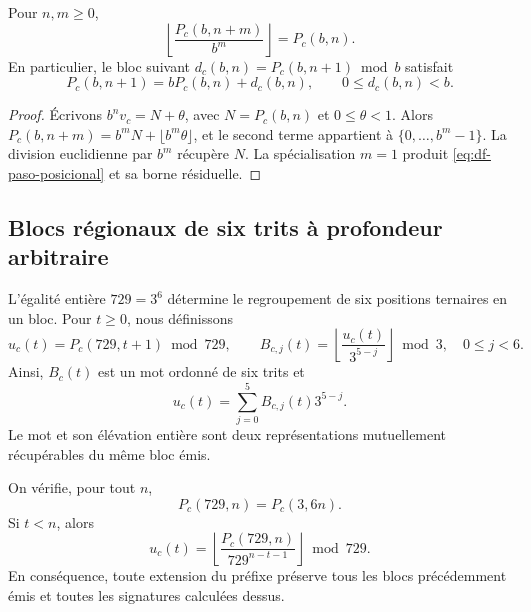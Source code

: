 \begin{proposition}
\label{prop:df-prefijos-compatibles}
Pour \(n,m\geq0\),
\begin{equation}
 \left\lfloor\frac{P_c(b,n+m)}{b^m}\right\rfloor=P_c(b,n).
 \label{eq:df-truncamiento}
\end{equation}
En particulier, le bloc suivant
\(d_c(b,n)=P_c(b,n+1)\bmod b\) satisfait
\begin{equation}
 P_c(b,n+1)=bP_c(b,n)+d_c(b,n),\qquad 0\leq d_c(b,n)<b.
 \label{eq:df-paso-posicional}
\end{equation}
\end{proposition}

\begin{proof}
Écrivons \(b^n v_c=N+\theta\), avec
\(N=P_c(b,n)\) et \(0\leq\theta<1\). Alors
\(P_c(b,n+m)=b^mN+\lfloor b^m\theta\rfloor\), et le second terme
appartient à \(\{0,\ldots,b^m-1\}\). La division euclidienne par \(b^m\)
récupère \(N\). La spécialisation \(m=1\) produit
\eqref{eq:df-paso-posicional} et sa borne résiduelle.
\end{proof}

\subsection{Blocs régionaux de six trits à profondeur arbitraire}
\label{subsec:df-bloques-arbitrarios}


L'égalité entière \(729=3^6\) détermine le regroupement de six positions ternaires en un bloc. Pour \(t\geq0\), nous définissons
\begin{equation}
 u_c(t)=P_c(729,t+1)\bmod729,
 \qquad
 B_{c,j}(t)=
 \left\lfloor\frac{u_c(t)}{3^{5-j}}\right\rfloor\bmod3,
 \quad 0\leq j<6.
 \label{eq:df-bloque-y-banda}
\end{equation}
Ainsi, \(B_c(t)\) est un mot ordonné de six trits et
\begin{equation}
 u_c(t)=\sum_{j=0}^{5}B_{c,j}(t)3^{5-j}.
 \label{eq:df-elevacion-banda}
\end{equation}
Le mot et son élévation entière sont deux représentations mutuellement récupérables du même bloc émis.

\begin{theorem}
\label{thm:df-bloque-estable}
On vérifie, pour tout \(n\),
\[
 P_c(729,n)=P_c(3,6n).
\]
Si \(t<n\), alors
\begin{equation}
 u_c(t)=
 \left\lfloor\frac{P_c(729,n)}{729^{n-t-1}}\right\rfloor\bmod729.
 \label{eq:df-bloque-prefijo-largo}
\end{equation}
En conséquence, toute extension du préfixe préserve tous les
blocs précédemment émis et toutes les signatures calculées dessus.
\end{theorem}

